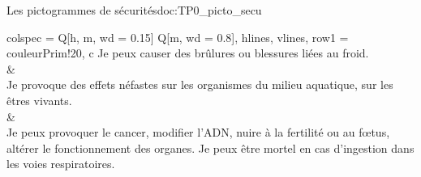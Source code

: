 \begin{doc}{Les pictogrammes de sécurités}{doc:TP0_picto_secu}
\begin{tblr}{
    colspec = {Q[h, m, wd = 0.15\linewidth] Q[m, wd = 0.8\linewidth]},
    hlines, vlines,
    row{1} = {couleurPrim!20, c}
  }
{    Je peux causer des brûlures ou blessures liées au froid.} \\
     &
    { \\
    Je provoque des effets néfastes sur les organismes du milieu aquatique, sur les êtres vivants.} \\
     &
    { \\
    Je peux provoquer le cancer, modifier l’ADN, nuire à la fertilité ou au f\oe{}tus, altérer le fonctionnement des organes.
    Je peux être mortel en cas d’ingestion dans les voies respiratoires.}
  \end{tblr}
\end{doc}